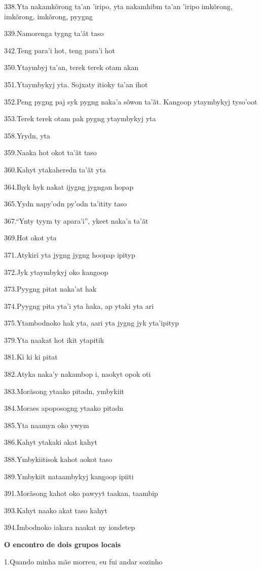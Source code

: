 338.Yta nakamkõrong ta'an 'iripo, yta nakamhibm ta'an 'iripo imkõrong,
imkõrong, imkõrong, pyygng

339.Namorenga tygng ta'ãt taso

342.Teng para'i hot, teng para'i hot

350.Ytaymbyj ta'an, terek terek otam akan

351.Ytaymbykyj yta. Sojxaty itioky ta'an ihot

352.Peng pygng paj syk pygng naka'a sõwon ta'ãt. Kangoop ytaymbykyj
tyso'oot

353.Terek terek otam pak pygng ytaymbykyj yta

358.Yrydn, yta

359.Naaka hot okot ta'ãt taso

360.Kahyt ytakaheredn ta'ãt yta

364.Ihyk hyk nakat ijygng jygngan hopap

365.Yydn napy'odn py'odn ta'itity taso

367.``Ynty tyym ty apara'i'', ykeet naka'a ta'ãt

369.Hot okot yta

371.Atykiri yta jygng jygng hoopap ipityp

372.Jyk ytaymbykyj oko kangoop

373.Pyygng pitat naka'at hak

374.Pyygng pita yta'i yta haka, ap ytaki yta ari

375.Ytambodnoko hak yta, aari yta jygng jyk yta'ipityp

379.Yta naakat hot ikit ytapitik

381.Ki ki ki pitat

382.Atyka naka'y nakambop i, naokyt opok oti

383.Morãsong ytaako pitadn, ymbykiit

384.Moraes apoposogng ytaako pitadn

385.Yta naamyn oko ywym

386.Kahyt ytakaki akat kahyt

388.Ymbykiitisok kahot aokot taso

389.Ymbykiit nataambykyj kangoop ipiiti

391.Morãsong kahot oko pawyyt taakan, taambip

393.Kahyt naako akat taso kahyt

394.Imbodnoko iakara naakat ny iondetep

\textbf{O encontro de dois grupos locais}

1.Quando minha mãe morreu, eu fui andar sozinho

